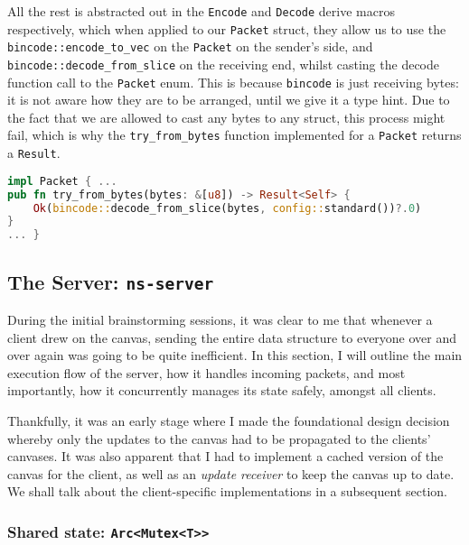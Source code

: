 \documentclass{article}
\newcommand{\code}[1]{\texttt{#1}}
\begin{document}

All the rest is abstracted out in the \code{Encode} and \code{Decode} derive
macros respectively, which when applied to our \code{Packet} struct, they allow
us to use the \code{bincode::encode\_to\_vec} on the \code{Packet} on the
sender's side, and \code{bincode::decode\_from\_slice} on the receiving end,
whilst casting the decode function call to the \code{Packet} enum. This is
because \code{bincode} is just receiving bytes: it is not aware how they are to
be arranged, until we give it a type hint. Due to the fact that we are allowed to cast
any bytes to any struct, this process might fail, which is why the
\code{try\_from\_bytes} function implemented for a \code{Packet} returns a \code{Result}.

{
\lstset{xleftmargin=0\textwidth, xrightmargin=0\textwidth}
\begin{subbox}{}
    \begin{lstlisting}[language=Rust]
impl Packet { ...
pub fn try_from_bytes(bytes: &[u8]) -> Result<Self> {
    Ok(bincode::decode_from_slice(bytes, config::standard())?.0)
}
... }
\end{lstlisting}
\end{subbox}
}

\newpage

\subsection{The Server: \code{ns-server}}

During the initial brainstorming sessions, it was clear to me that whenever a
client drew on the canvas, sending the entire data structure to everyone over
and over again was going to be quite inefficient. In this section, I will
outline the main execution flow of the server, how it handles incoming packets,
and most importantly, how it concurrently manages its state safely, amongst all
clients.

Thankfully, it was an early stage where I made the foundational design decision
whereby only the updates to the canvas had to be propagated to the clients'
canvases. It was also apparent that I had to implement a cached version of the
canvas for the client, as well as an \textit{update receiver} to keep the canvas
up to date. We shall talk about the client-specific implementations in a
subsequent section.


\subsubsection{Shared state: \code{Arc<Mutex<T>{>}}}
\end{document}
